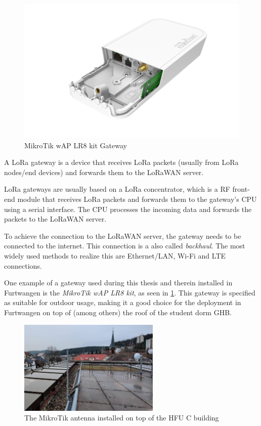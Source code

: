 \begin{figure}[h]
    \centering
    \includegraphics[width=.6\textwidth]{pictures/hardware/gateways/mikrotik-lr8-kit.png}
    \caption{MikroTik wAP LR8 kit Gateway~\protect\cite{the_things_industries_bv_lorawan_nodate}}\label{pic:mikrotik-lr8-kit-gateway}
\end{figure}

A \ac{LoRa} gateway is a device that receives \ac{LoRa} packets (usually from \ac{LoRa} nodes/end devices) and forwards them to the \ac{LoRaWAN} server.

\ac{LoRa} gateways are usually based on a \ac{LoRa} concentrator, which is a \ac{RF} front-end module that receives \ac{LoRa} packets and forwards them to the gateway's \ac{CPU} using a serial interface.
The \ac{CPU} processes the incoming data and forwards the packets to the \ac{LoRaWAN} server.

To achieve the connection to the \ac{LoRaWAN} server, the gateway needs to be connected to the internet.
This connection is a also called \emph{backhaul}.
The most widely used methods to realize this are Ethernet/\ac{LAN}, Wi-Fi and \ac{LTE} connections.

One example of a gateway used during this thesis and therein installed in Furtwangen is the \emph{MikroTik wAP LR8 kit}, as seen in \cref{pic:mikrotik-lr8-kit-gateway}.
This gateway is specified as suitable for outdoor usage, making it a good choice for the deployment in Furtwangen on top of (among others) the roof of the student dorm \ac{GHB}.

\begin{figure}[h]
    \centering
    \includegraphics[width=0.6\textwidth]{pictures/hardware/gateway-deployment/mikrotik-antenna-c-building.jpg}
    \caption{The MikroTik antenna installed on top of the \ac{HFU} C building}\label{pic:mikrotik-antenna-c-building}
\end{figure}

